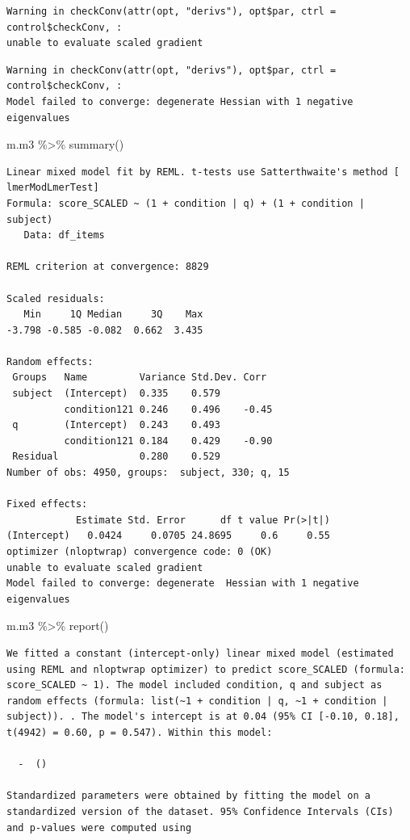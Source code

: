 \documentclass[
  letterpaper,
  DIV=11,
  numbers=noendperiod]{scrreprt}
\newenvironment{Shaded}{\begin{snugshade}}{\end{snugshade}}
\newcommand{\FunctionTok}[1]{\textcolor[rgb]{0.28,0.35,0.67}{#1}}
\newcommand{\NormalTok}[1]{\textcolor[rgb]{0.00,0.23,0.31}{#1}}
\newcommand{\SpecialCharTok}[1]{\textcolor[rgb]{0.37,0.37,0.37}{#1}}
\begin{document}
\begin{verbatim}
Warning in checkConv(attr(opt, "derivs"), opt$par, ctrl = control$checkConv, :
unable to evaluate scaled gradient
\end{verbatim}

\begin{verbatim}
Warning in checkConv(attr(opt, "derivs"), opt$par, ctrl = control$checkConv, :
Model failed to converge: degenerate Hessian with 1 negative eigenvalues
\end{verbatim}

\begin{Shaded}
\begin{Highlighting}[]
\NormalTok{m.m3 }\SpecialCharTok{\%\textgreater{}\%} \FunctionTok{summary}\NormalTok{() }
\end{Highlighting}
\end{Shaded}

\begin{verbatim}
Linear mixed model fit by REML. t-tests use Satterthwaite's method [
lmerModLmerTest]
Formula: score_SCALED ~ (1 + condition | q) + (1 + condition | subject)
   Data: df_items

REML criterion at convergence: 8829

Scaled residuals: 
   Min     1Q Median     3Q    Max 
-3.798 -0.585 -0.082  0.662  3.435 

Random effects:
 Groups   Name         Variance Std.Dev. Corr 
 subject  (Intercept)  0.335    0.579         
          condition121 0.246    0.496    -0.45
 q        (Intercept)  0.243    0.493         
          condition121 0.184    0.429    -0.90
 Residual              0.280    0.529         
Number of obs: 4950, groups:  subject, 330; q, 15

Fixed effects:
            Estimate Std. Error      df t value Pr(>|t|)
(Intercept)   0.0424     0.0705 24.8695     0.6     0.55
optimizer (nloptwrap) convergence code: 0 (OK)
unable to evaluate scaled gradient
Model failed to converge: degenerate  Hessian with 1 negative eigenvalues
\end{verbatim}

\begin{Shaded}
\begin{Highlighting}[]
\NormalTok{m.m3 }\SpecialCharTok{\%\textgreater{}\%} \FunctionTok{report}\NormalTok{()}
\end{Highlighting}
\end{Shaded}

\begin{verbatim}
We fitted a constant (intercept-only) linear mixed model (estimated using REML and nloptwrap optimizer) to predict score_SCALED (formula: score_SCALED ~ 1). The model included condition, q and subject as random effects (formula: list(~1 + condition | q, ~1 + condition | subject)). . The model's intercept is at 0.04 (95% CI [-0.10, 0.18], t(4942) = 0.60, p = 0.547). Within this model:

  -  ()

Standardized parameters were obtained by fitting the model on a standardized version of the dataset. 95% Confidence Intervals (CIs) and p-values were computed using 
\end{verbatim}
\end{document}
